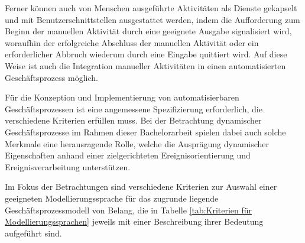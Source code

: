 Ferner können auch von Menschen ausgeführte Aktivitäten als Dienste gekapselt und mit Benutzerschnittstellen ausgestattet werden, indem die Aufforderung zum Beginn der manuellen Aktivität durch eine geeignete Ausgabe signalisiert wird, woraufhin der erfolgreiche Abschluss der manuellen Aktivität oder ein erforderlicher Abbruch wiederum durch eine Eingabe quittiert wird. 
Auf diese Weise ist auch die Integration manueller Aktivitäten in einen automatisierten Geschäftsprozess möglich.
\cite{Weske.2007}

Für die Konzeption und Implementierung von automatisierbaren Geschäftsprozessen ist eine angemessene Spezifizierung erforderlich, die verschiedene Kriterien erfüllen muss.
Bei der Betrachtung dynamischer Geschäftsprozesse im Rahmen dieser Bachelorarbeit spielen dabei auch solche Merkmale eine herausragende Rolle, welche die Ausprägung dynamischer Eigenschaften anhand einer zielgerichteten Ereignisorientierung und Ereignisverarbeitung unterstützen. 

Im Fokus der Betrachtungen sind verschiedene Kriterien zur Auswahl einer geeigneten Modellierungssprache für das zugrunde liegende Geschäftsprozessmodell von Belang, die in Tabelle \ref{tab:Kriterien für Modellierungssprachen} jeweils mit einer Beschreibung ihrer Bedeutung aufgeführt sind.


